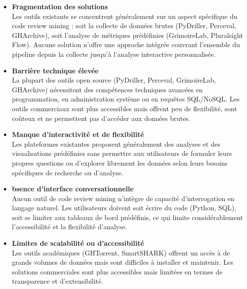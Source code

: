 \begin{itemize}
    \item  \textbf{Fragmentation des solutions} \\
    Les outils existants se concentrent généralement sur un aspect spécifique du code review mining : soit la collecte de données brutes (PyDriller, Perceval, GHArchive), soit l'analyse de métriques prédéfinies (GrimoireLab, Pluralsight Flow). Aucune solution n'offre une approche intégrée couvrant l'ensemble du pipeline depuis la collecte jusqu'à l'analyse interactive personnalisée.
    \\
    \item  \textbf{Barrière technique élevée} \\
    La plupart des outils open source (PyDriller, Perceval, GrimoireLab, GHArchive) nécessitent des compétences techniques avancées en programmation, en administration système ou en requêtes SQL/NoSQL. Les outils commerciaux sont plus accessibles mais offrent peu de flexibilité, sont coûteux et ne permettent pas d'accéder aux données brutes.
    \\
    \item  \textbf{Manque d’interactivité et de flexibilité} \\
    Les plateformes existantes proposent généralement des analyses et des visualisations prédéfinies sans permettre aux utilisateurs de formuler leurs propres questions ou d’explorer librement les données selon leurs besoins spécifiques de recherche ou d’analyse.
    \\
    \item  \textbf{bsence d’interface conversationnelle} \\
    Aucun outil de code review mining n’intègre de capacité d’interrogation en langage naturel. Les utilisateurs doivent soit écrire du code (Python, SQL), soit se limiter
    aux tableaux de bord prédéfinis, ce qui limite considérablement l’accessibilité et la flexibilité d’analyse.
    \\
    \item  \textbf{Limites de scalabilité ou d’accessibilité} \\
    Les outils académiques (GHTorrent, SmartSHARK) offrent un accès à de grands volumes de données mais sont difficiles à installer et maintenir. Les solutions commerciales sont plus accessibles mais limitées en termes de transparence et d’extensibilité.
    
\end{itemize}

